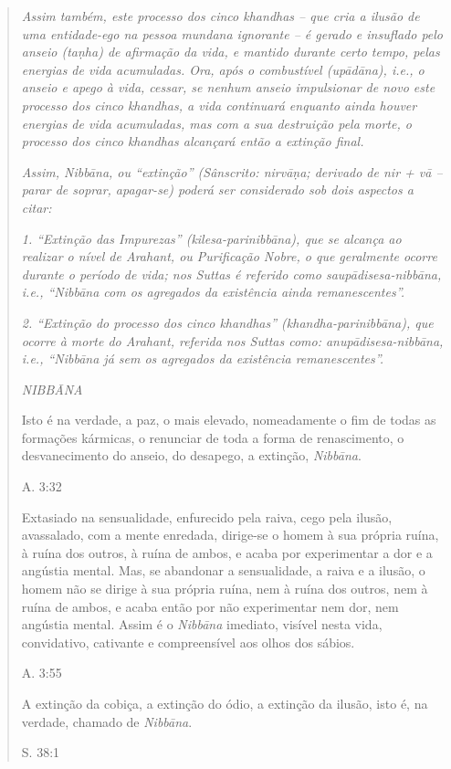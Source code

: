 \begin{quote}
\emph{Assim também, este processo dos cinco khandhas -- que cria a ilusão de uma entidade-ego na pessoa mundana ignorante -- é gerado e insuflado pelo anseio (taṇha) de afirmação da vida, e mantido durante certo tempo, pelas energias de vida acumuladas. Ora, após o combustível (upādāna), i.e., o anseio e apego à vida, cessar, se nenhum anseio impulsionar de novo este processo dos cinco khandhas, a vida continuará enquanto ainda houver energias de vida acumuladas, mas com a sua destruição pela morte, o processo dos cinco khandhas alcançará então a extinção final.}

\emph{Assim, Nibbāna, ou ``extinção'' (Sânscrito: nirvāṇa; derivado de nir + vā -- parar de soprar, apagar-se) poderá ser considerado sob dois aspectos a citar:}

\emph{1. ``Extinção das Impurezas'' (kilesa-parinibbāna), que se alcança ao realizar o nível de Arahant, ou Purificação Nobre, o que geralmente ocorre durante o período de vida; nos Suttas é referido como saupādisesa-nibbāna, i.e., ``Nibbāna com os agregados da existência ainda remanescentes''.}

\emph{2. ``Extinção do processo dos cinco khandhas'' (khandha-parinibbāna), que ocorre à morte do Arahant, referida nos Suttas como: anupādisesa-nibbāna, i.e., ``Nibbāna já sem os agregados da existência remanescentes''.}

\emph{NIBBĀNA}

Isto é na verdade, a paz, o mais elevado, nomeadamente o fim de todas as formações kármicas, o renunciar de toda a forma de renascimento, o desvanecimento do anseio, do desapego, a extinção, \emph{Nibbāna}.

A. 3:32

Extasiado na sensualidade, enfurecido pela raiva, cego pela ilusão, avassalado, com a mente enredada, dirige-se o homem à sua própria ruína, à ruína dos outros, à ruína de ambos, e acaba por experimentar a dor e a angústia mental. Mas, se abandonar a sensualidade, a raiva e a ilusão, o homem não se dirige à sua própria ruína, nem à ruína dos outros, nem à ruína de ambos, e acaba então por não experimentar nem dor, nem angústia mental. Assim é o \emph{Nibbāna} imediato, visível nesta vida, convidativo, cativante e compreensível aos olhos dos sábios.

A. 3:55

A extinção da cobiça, a extinção do ódio, a extinção da ilusão, isto é, na verdade, chamado de \emph{Nibbāna}.

S. 38:1


\end{quote}
